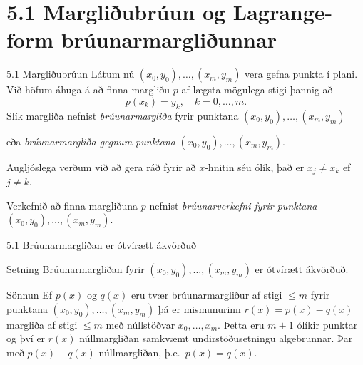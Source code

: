 %  

\section*{5.1 Margliðubrúun og Lagrange-form brúunarmargliðunnar}
\begin{frame}{5.1 Margliðubrúun} 
Látum nú $(x_0,y_0), \ldots, (x_m,y_m)$ vera gefna punkta í plani. 
Við höfum áhuga á að finna margliðu $p$ af lægsta mögulega stigi þannig að
\begin{equation*}
  p(x_k) = y_k, \quad k = 0, \ldots, m.
\end{equation*}\pause
Slík margliða nefnist {\em brúunarmargliða} fyrir punktana
$(x_0,y_0), \ldots, (x_m,y_m)$  

\pause
eða {\em brúunarmargliða gegnum punktana} $(x_0,y_0), \ldots, (x_m,y_m)$. 

\smallskip
Augljóslega verðum 
við að gera ráð fyrir að $x$-hnitin séu ólík, það er $x_j \not= x_k$ ef $j
\not= k$.  

\pause
\smallskip
Verkefnið að finna margliðuna $p$ nefnist {\em brúunarverkefni fyrir
  punktana}
 $(x_0,y_0), \ldots, (x_m,y_m)$.
\end{frame}

\begin{frame}{5.1 Brúunarmargliðan er ótvírætt ákvörðuð} 
\begin{block}{Setning}
 Brúunarmargliðan fyrir $(x_0,y_0),\ldots,(x_m,y_m)$ er ótvírætt
 ákvörðuð.
\end{block}\pause
\begin{block}{Sönnun}
Ef $p(x)$ og $q(x)$ eru tvær brúunarmargliður af stigi $\leq m$ 
fyrir punktana $(x_0,y_0), \ldots, (x_m,y_m)$ 
þá er mismunurinn $r(x) = p(x) - q(x)$ margliða af stigi $\leq m$ 
með núllstöðvar $x_0, \ldots, x_m$. 
\pause
Þetta eru $m+1$ ólíkir punktar 
og því er $r(x)$ núllmargliðan samkvæmt undirstöðusetningu algebrunnar. 
\pause
Þar með $p(x) - q(x)$ núllmargliðan, þ.e.~$p(x) = q(x)$.
\end{block}
\end{frame}

